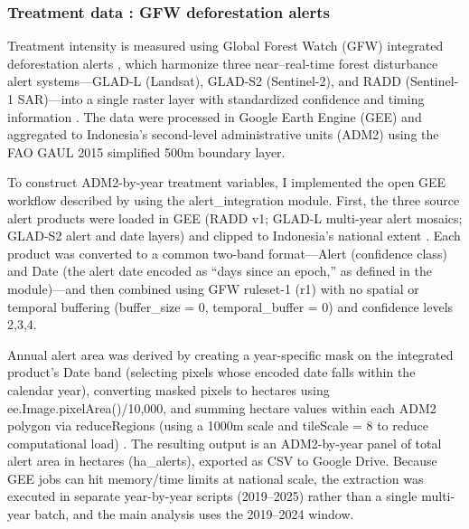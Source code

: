 \documentclass[hidelinks,12pt]{article}
\begin{document}
\subsubsection{Treatment data : GFW deforestation alerts} 

Treatment intensity is measured using Global Forest Watch (GFW) integrated deforestation alerts \citep{gfw2022integrated_alerts_dataset,gfw_nd_integrated_alerts_help}, which harmonize three near--real-time forest disturbance alert systems---GLAD-L (Landsat), GLAD-S2 (Sentinel-2), and RADD (Sentinel-1 SAR)---into a single raster layer with standardized confidence and timing information \citep{reiche2024integrating_alerts}. The data \citep{hansen2024gfc_v112_gee} were processed in Google Earth Engine (GEE) and aggregated to Indonesia’s second-level administrative units (ADM2) using the FAO GAUL 2015 simplified 500m boundary layer.

To construct ADM2-by-year treatment variables, I implemented the open GEE workflow described by \citet{reiche2024integrating_alerts} using the alert\_integration module. First, the three source alert products were loaded in GEE (RADD v1; GLAD-L multi-year alert mosaics; GLAD-S2 alert and date layers) and clipped to Indonesia’s national extent \citep{gfw_nd_radd_dataset,hansen2016glad_landsat_alerts,pickens2020glad_s2_dataset}. Each product was converted to a common two-band format—Alert (confidence class) and Date (the alert date encoded as “days since an epoch,” as defined in the module)—and then combined using GFW ruleset-1 (r1) with no spatial or temporal buffering (buffer\_size = 0, temporal\_buffer = 0) and confidence levels 2,3,4.

Annual alert area was derived by creating a year-specific mask on the integrated product’s Date band (selecting pixels whose encoded date falls within the calendar year), converting masked pixels to hectares using ee.Image.pixelArea()/10,000, and summing hectare values within each ADM2 polygon via reduceRegions (using a 1000m scale and tileScale = 8 to reduce computational load) \citep{gorelick2017gee,reiche2024integrating_alerts}. The resulting output is an ADM2-by-year panel of total alert area in hectares (ha\_alerts), exported as CSV to Google Drive. Because GEE jobs can hit memory/time limits at national scale, the extraction was executed in separate year-by-year scripts (2019–2025) rather than a single multi-year batch, and the main analysis uses the 2019–2024 window.
\end{document}
